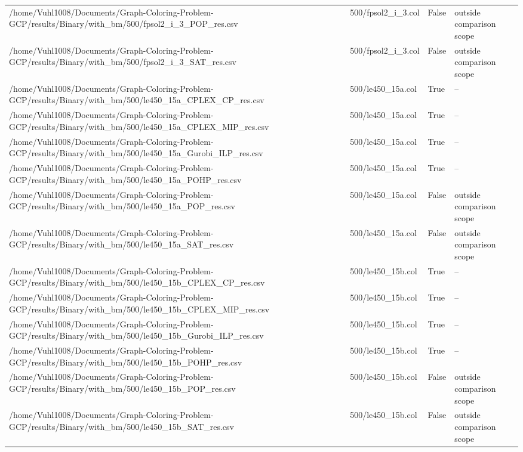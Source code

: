 \begin{table}[htbp]
\begin{tabular}{llll}
/home/Vuhl1008/Documents/Graph-Coloring-Problem-GCP/results/Binary/with\_bm/500/fpsol2\_i\_3\_POP\_res.csv & 500/fpsol2\_i\_3.col & False & outside comparison scope \\
/home/Vuhl1008/Documents/Graph-Coloring-Problem-GCP/results/Binary/with\_bm/500/fpsol2\_i\_3\_SAT\_res.csv & 500/fpsol2\_i\_3.col & False & outside comparison scope \\
/home/Vuhl1008/Documents/Graph-Coloring-Problem-GCP/results/Binary/with\_bm/500/le450\_15a\_CPLEX\_CP\_res.csv & 500/le450\_15a.col & True & -- \\
/home/Vuhl1008/Documents/Graph-Coloring-Problem-GCP/results/Binary/with\_bm/500/le450\_15a\_CPLEX\_MIP\_res.csv & 500/le450\_15a.col & True & -- \\
/home/Vuhl1008/Documents/Graph-Coloring-Problem-GCP/results/Binary/with\_bm/500/le450\_15a\_Gurobi\_ILP\_res.csv & 500/le450\_15a.col & True & -- \\
/home/Vuhl1008/Documents/Graph-Coloring-Problem-GCP/results/Binary/with\_bm/500/le450\_15a\_POHP\_res.csv & 500/le450\_15a.col & True & -- \\
/home/Vuhl1008/Documents/Graph-Coloring-Problem-GCP/results/Binary/with\_bm/500/le450\_15a\_POP\_res.csv & 500/le450\_15a.col & False & outside comparison scope \\
/home/Vuhl1008/Documents/Graph-Coloring-Problem-GCP/results/Binary/with\_bm/500/le450\_15a\_SAT\_res.csv & 500/le450\_15a.col & False & outside comparison scope \\
/home/Vuhl1008/Documents/Graph-Coloring-Problem-GCP/results/Binary/with\_bm/500/le450\_15b\_CPLEX\_CP\_res.csv & 500/le450\_15b.col & True & -- \\
/home/Vuhl1008/Documents/Graph-Coloring-Problem-GCP/results/Binary/with\_bm/500/le450\_15b\_CPLEX\_MIP\_res.csv & 500/le450\_15b.col & True & -- \\
/home/Vuhl1008/Documents/Graph-Coloring-Problem-GCP/results/Binary/with\_bm/500/le450\_15b\_Gurobi\_ILP\_res.csv & 500/le450\_15b.col & True & -- \\
/home/Vuhl1008/Documents/Graph-Coloring-Problem-GCP/results/Binary/with\_bm/500/le450\_15b\_POHP\_res.csv & 500/le450\_15b.col & True & -- \\
/home/Vuhl1008/Documents/Graph-Coloring-Problem-GCP/results/Binary/with\_bm/500/le450\_15b\_POP\_res.csv & 500/le450\_15b.col & False & outside comparison scope \\
/home/Vuhl1008/Documents/Graph-Coloring-Problem-GCP/results/Binary/with\_bm/500/le450\_15b\_SAT\_res.csv & 500/le450\_15b.col & False & outside comparison scope \\

\end{tabular}
\end{table}
